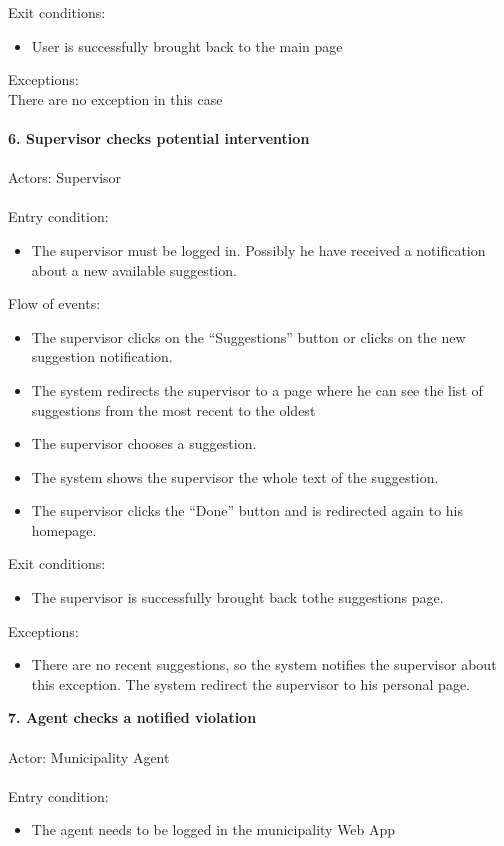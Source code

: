 \documentclass[a4paper]{report}
\begin{document}
Exit conditions:
\begin{itemize}
\item User is successfully brought back to the main page
\end{itemize}
Exceptions: \\There are no exception in this case
\\ \\
\textbf{6. Supervisor checks potential intervention}\label{uc:6}
\\ \\
Actors: Supervisor \\ \\
Entry condition: 
\begin{itemize}
\item The supervisor must be logged in. Possibly he have received a notification about a new available suggestion. 
\end{itemize}
Flow of events:
\begin{itemize}
\item The supervisor clicks on the “Suggestions” button or clicks on the new suggestion notification.
\item The system redirects the supervisor to a page where he can see the list of suggestions from the most recent to the oldest
\item The supervisor chooses a suggestion.
\item The system shows the supervisor the whole text of the suggestion.
\item The supervisor clicks the “Done” button and is redirected again to his homepage.
\end{itemize}
Exit conditions:
\begin{itemize}
\item The supervisor is successfully brought back tothe suggestions page.
\end{itemize}
Exceptions:
\begin{itemize}
\item There are no recent suggestions, so the system notifies the supervisor about this exception. The system redirect the supervisor to his personal page.
\end{itemize}
\textbf{7. Agent checks a notified violation}\label{uc:7}
\\ \\
Actor: Municipality Agent \\ \\
Entry condition: 	
\begin{itemize}
\item The agent needs to be logged in the municipality Web App
\end{itemize}
\end{document}
